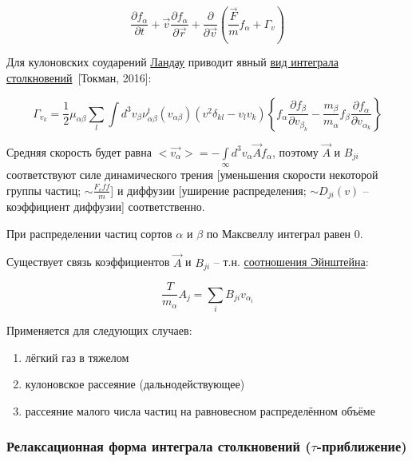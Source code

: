 \documentclass[10pt, a4paper]{article}
\newcommand{\Tokman}{~[Токман, 2016]}
\begin{document}
\begin{equation*}
	\frac{\partial f_\alpha}{\partial t}+\vec{v}\frac{\partial f_\alpha}{\partial \vec{r}}+\frac{\partial}{\partial \vec{v}}\left(\frac{\vec{F}}{m}f_\alpha+\Gamma_v\right)
\end{equation*}

Для кулоновских соударений \uline{Ландау} приводит явный \uline{вид интеграла столкновений}\Tokman:

\begin{equation} \label{eq:Landau_collision_term}
	\Gamma_{v_{k}} = \frac{1}{2}\mu_{\alpha\beta}\sum\limits_{l}\int d^3v_\beta \nu_{\alpha\beta}^t(v_{\alpha\beta}) (v^2\delta_{kl}-v_lv_k)\left\{f_\alpha\frac{\partial f_\beta}{\partial v_{\beta_{k}}}-\frac{m_\beta}{m_\alpha}f_\beta\frac{\partial f_\alpha}{\partial v_{\alpha_{k}}}\right\}
\end{equation}

Средняя скорость будет равна $<\vec{v_\alpha}> = -\int\limits_{\infty}d^3v_\alpha \vec{A}f_\alpha$, поэтому $\vec{A}$ и $B_{ji}$ соответствуют силе динамического трения [уменьшения скорости некоторой группы частиц; $\sim \frac{F_eff}{m}$] и диффузии [уширение распределения; $\sim D_{ji}(v)$ -- коэффициент диффузии] соответственно. 

При распределении частиц сортов $\alpha$ и $\beta$ по Максвеллу интеграл равен 0.

Существует связь коэффициентов $\vec{A}$ и $B_{ji}$ -- т.н. \uline{соотношения Эйнштейна}:

\begin{equation} \label{eq:Einstein_relation}
	\frac{T}{m_\alpha}A_j = \sum\limits_{i} B_{ji} v_{\alpha_{i}}
\end{equation}

Применяется для следующих случаев:

\begin{enumerate} 
	\item лёгкий газ в тяжелом
	\item кулоновское рассеяние (дальнодействующее)
	\item рассеяние малого числа частиц на равновесном распределённом объёме
\end{enumerate}


\subsubsection{Релаксационная форма интеграла 	столкновений \linebreak ($\tau$-приближение)}
\end{document}
